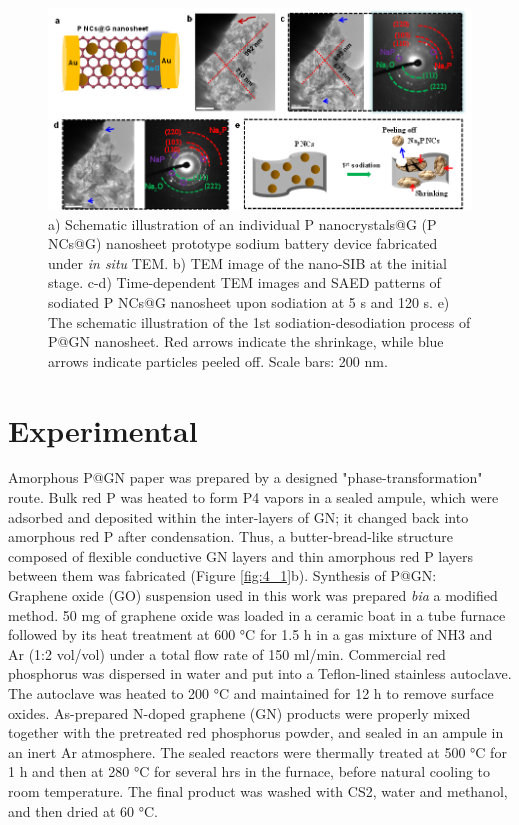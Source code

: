 \begin{figure}  
\includegraphics[width=\textwidth,angle=0]{figures/figure4_s3}
\caption[Layered structure design]
{a) Schematic illustration of an individual P nanocrystals@G (P NCs@G) nanosheet prototype sodium battery device fabricated under {\em in situ} TEM. b) TEM image of the nano-SIB at the initial stage. c-d) Time-dependent TEM images and SAED patterns of sodiated P NCs@G nanosheet upon sodiation at 5 s and 120 s. e) The schematic illustration of the 1st sodiation-desodiation process of P@GN nanosheet. Red arrows indicate the shrinkage, while blue arrows indicate particles peeled off. Scale bars: 200 nm. 
\label{fig:4_s3}}
\end{figure}

\section{Experimental}
Amorphous P@GN paper was prepared by a designed "phase-transformation" route. Bulk red P was heated to form P4 vapors in a sealed ampule, which were adsorbed and deposited within the inter-layers of GN; it changed back into amorphous red P after condensation.\cite{Roth1947b} Thus, a butter-bread-like structure composed of flexible conductive GN layers and thin amorphous red P layers between them was fabricated (Figure \ref{fig:4_1}b). 
Synthesis of P@GN: \\
Graphene oxide (GO) suspension used in this work was prepared \textit{bia} a modified method. 50 mg of graphene oxide was loaded in a ceramic boat in a tube furnace followed by its heat treatment at 600 °C for 1.5 h in a gas mixture of NH3 and Ar (1:2 vol/vol) under a total flow rate of 150 ml/min. Commercial red phosphorus was dispersed in water and put into a Teflon-lined stainless autoclave. The autoclave was heated to 200 °C and maintained for 12 h to remove surface oxides. As-prepared N-doped graphene (GN) products were properly mixed together with the pretreated red phosphorus powder, and sealed in an ampule in an inert Ar atmosphere. The sealed reactors were thermally treated at 500 °C for 1 h and then at 280 °C for several hrs in the furnace, before natural cooling to room temperature. The final product was washed with CS2, water and methanol, and then dried at 60 °C.\\


